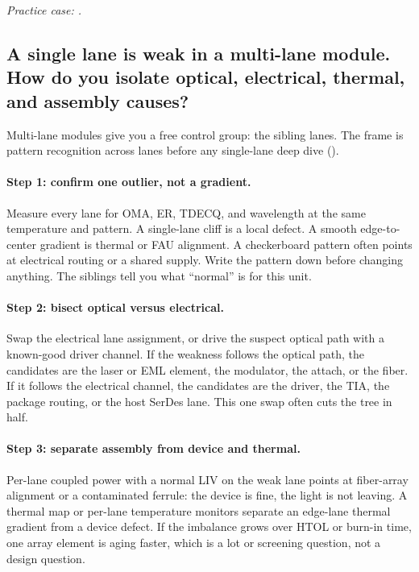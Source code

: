 \noindent\textit{Practice case: .}
\subsection{A single lane is weak in a multi-lane module. How do you isolate
optical, electrical, thermal, and assembly causes?}
\label{sec:interview-worked-lane}

Multi-lane modules give you a free control group: the sibling lanes. The
frame is pattern recognition across lanes before any single-lane deep dive
().

\paragraph{Step 1: confirm one outlier, not a gradient.}
Measure every lane for OMA, ER,
TDECQ, and wavelength at the same temperature and pattern. A
single-lane cliff is a local defect. A smooth edge-to-center gradient is
thermal or FAU alignment. A checkerboard pattern often points
at electrical routing or a shared supply. Write the pattern down before
changing anything. The siblings tell you what ``normal'' is for this unit.

\paragraph{Step 2: bisect optical versus electrical.}
Swap the electrical lane assignment, or drive the suspect optical path with
a known-good driver channel. If the weakness follows the optical path, the
candidates are the laser or EML element, the modulator, the
attach, or the fiber. If it follows the electrical channel, the candidates
are the driver, the TIA, the package routing, or the host
SerDes lane. This one swap often cuts the tree in half.

\paragraph{Step 3: separate assembly from device and thermal.}
Per-lane coupled power with a normal LIV on the weak lane
points at fiber-array alignment or a contaminated ferrule: the device is
fine, the light is not leaving. A thermal map or per-lane temperature
monitors separate an edge-lane thermal gradient from a device defect. If the
imbalance grows over HTOL or burn-in time, one array element
is aging faster, which is a lot or screening question, not a design question.

